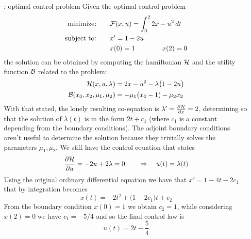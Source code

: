 \begin{example}{: optimal control problem}
	Given the optimal control problem
	\begin{align*}
		\textrm{minimize:} \qquad & \mathcal{F} (x,u) = \int_0^2 2x- u^2 \, dt   \\
		\textrm{subject to:} \qquad & x' = 1-2u \\ & x(0) = 1 \qquad \qquad x(2) = 0
	\end{align*}
	the solution can be obtained by computing the hamiltonian $\mathcal{H}$ and the utility function $\mathcal{B}$ related to the problem:
	\begin{align*}
		\mathcal{H}(x,u,\lambda) & = 2x - u^2 - \lambda \big(1-2u\big) \\
		\mathcal{B}(x_0,x_2, \mu_1, \mu_2) & = - \mu_1 \big(x_0-1) - \mu_2 x_2
	\end{align*}
	With that stated, the lonely resulting co-equation is $\lambda' = \frac{\partial \mathcal{H}}{\partial x} = 2$, determining so that the solution of $\lambda(t)$ is in the form $2t + c_1$ (where $c_1$ is a constant depending from the boundary conditions). The adjoint boundary conditions aren't useful to determine the solution because they trivially solves the parameters $\mu_1,\mu_2$. We still have the control equation that states
	\[ \frac{\partial \mathcal{H}}{\partial u} = -2u + 2\lambda = 0 \qquad \Rightarrow \quad u(t) = \lambda(t) \]
	Using the original ordinary differential equation we have that $x' = 1 - 4t - 2c_1$ that by integration becomes
	\[ x(t) = -2t^2 + \big(1-2c_1\big) t + c_2 \]
	From the boundary condition $x(0) = 1$ we obtain $c_2 = 1$, while considering $x(2) = 0$ we have $c_1 = -5/4$ and so the final control law is
	\[ u(t) = 2t - \frac 5 4  \]
\end{example}

